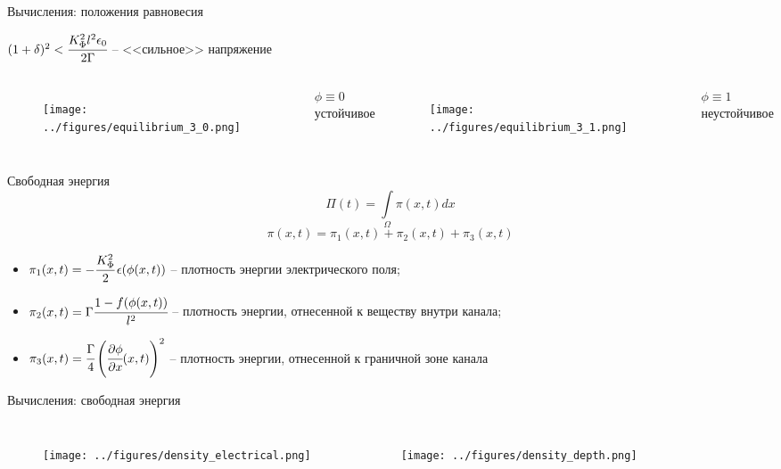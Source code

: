 \documentclass[aspectratio=169]{beamer}
\begin{document}
\begin{frame}{Вычисления: положения равновесия}
\vspace{-0.4cm}
\begin{center}
	$(1 + \delta)^2 < \cfrac{K_\Phi^2 l^2 \epsilon_0}{2 \Gamma}$ -- <<сильное>> напряжение
\end{center}
\vspace{-0.4cm}
\begin{columns}
\begin{figure}
	\texttt{[image: ../figures/equilibrium\_3\_0.png]}
\end{figure}
\vspace{-0.6cm}
\begin{center}
	$\phi \equiv 0$ \\
	устойчивое
\end{center}
\begin{figure}
	\texttt{[image: ../figures/equilibrium\_3\_1.png]}
\end{figure}
\vspace{-0.6cm}
\begin{center}
	$\phi \equiv 1$ \\
	неустойчивое
\end{center}
\end{columns}
\end{frame}


\begin{frame}{Свободная энергия}
\vspace{-0.7cm}
$$\Pi(t) = \int\limits_\Omega \pi(x, t) dx$$
$$\pi(x, t) = \pi_1(x, t) + \pi_2(x, t) + \pi_3(x, t)$$
\vspace{-0.3cm}
\begin{itemize}
	\item $\pi_1(x, t) = -\cfrac{K_\Phi^2}{2} \, \epsilon(\phi(x, t))$ -- плотность энергии
	электрического поля;
	\item $\pi_2(x, t) = \Gamma \cfrac{1 - f(\phi(x, t))}{l^2}$ -- плотность энергии, отнесенной
	к веществу внутри канала;
	\item $\pi_3(x, t) = \cfrac{\Gamma}{4} \left( \cfrac{\partial \phi}{\partial x}(x, t)
	\right)^2$ -- плотность энергии, отнесенной к граничной зоне канала
\end{itemize}
\end{frame}


\begin{frame}{Вычисления: свободная энергия}
\vspace{-0.8cm}
\begin{columns}
\begin{figure}
	\texttt{[image: ../figures/density\_electrical.png]}
\end{figure}
\begin{figure}
	\texttt{[image: ../figures/density\_depth.png]}
\end{figure}
\end{columns}
\end{frame}
\end{document}

